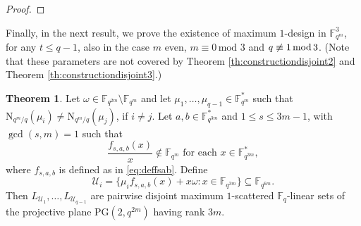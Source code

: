 \documentclass[11pt]{amsart}
\theoremstyle{definition}
\newtheorem{theorem}{Theorem}[section]
\newcommand{\F}{{\mathbb F}}
\newcommand{\U}{{\mathcal{U}}}
\renewcommand{\mod}{\hbox{{\rm mod}\,}}
\newcommand{\PG}{\mathrm{PG}}
\newcommand{\N}{\mathrm{N}}
\begin{document}
{\begin{proof}
\end{proof}
 Finally, in the next result, we prove the existence of maximum $1$-design in $\F_{q^m}^3$, for any $t \leq q-1$, also in the case $m$ even, $m \equiv 0 \, \mbox{mod } 3$ and $q \not \equiv 1 \, \mod 3$. (Note that these parameters are not covered by Theorem \ref{th:constructiondisjoint2} and Theorem \ref{th:constructiondisjoint3}.)   


\begin{theorem} \label{th:disjoint4}
    Let $\omega \in \F_{q^{2m}} \setminus \F_{q^{m}}$ and let $\mu_1,\ldots,\mu_{q-1} \in \F_{q^m}^*$ such that $\N_{q^m/q}(\mu_i) \neq \N_{q^m/q}(\mu_j)$, if $i \neq j$. Let $a, b \in  \F_{q^{3m}}^*$ and $1 \leq s \leq 3m-1$, with $\gcd(s,m)=1$ such that
\[
\frac{f_{s,a,b}(x)}{x} \notin \F_{q^m} \mbox{ for each }x \in \F_{q^{3m}}^*,
\]
where $f_{s,a,b}$ is defined as in \eqref{eq:deffsab}.
    Define
\[\U_i=\{ \mu_if_{s,a,b}(x)+x\omega \colon x \in  \F_{q^{3m}}\} \subseteq \F_{q^{6m}}.\]
Then $L_{\U_1},\ldots,L_{\U_{q-1}}$ are pairwise disjoint maximum $1$-scattered $\F_q$-linear sets of the projective plane $\PG(2,q^{2m})$ having rank $3m$.
\end{theorem}

}
\end{document}
